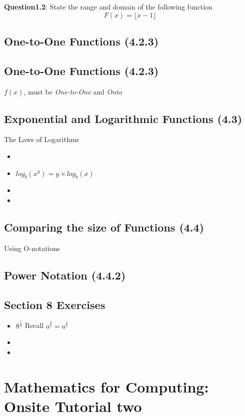 \documentclass{article}
\begin{document}
\noindent \textbf{Question1.2}: State the range and domain of the following function
\[ F(x) = \lfloor x-1 \rfloor \]
\subsection*{One-to-One Functions (4.2.3)}


\subsection*{One-to-One Functions (4.2.3)}
$f(x)$, must be \emph{One-to-One} and \emph{Onto}



\subsection*{Exponential and Logarithmic Functions (4.3)}

The Laws of Logarithms
\begin{itemize}
\item
\item $log_b(x^y) = y \times log_b(x)$
\item
\item
\end{itemize}

\subsection*{Comparing the size of Functions (4.4)}

Using O-notations

\subsection*{Power Notation (4.4.2)}


\subsection*{Section 8 Exercises}
\begin{itemize}
\item $8^{\frac{1}{3}}$ Recall $a^{\frac{b}{c}} = a^{\frac{b}{c}}$
\item
\item
\end{itemize}


\section{Mathematics for Computing: Onsite Tutorial two}
\end{document}
